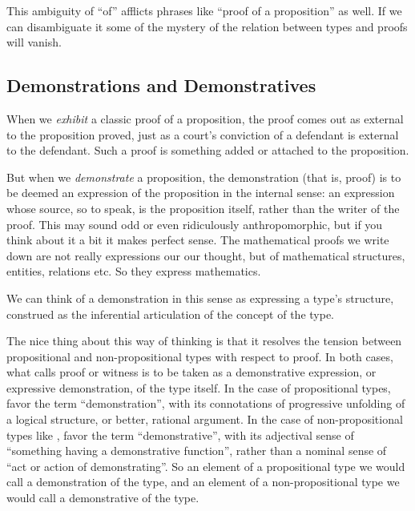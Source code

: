 This ambiguity of ``of'' afflicts phrases like ``proof of a
proposition'' as well.  If we can disambiguate it some of the mystery
of the relation between types and proofs will vanish.

\subsection{Demonstrations and Demonstratives}
\label{subs:}

When we \textit{exhibit} a classic proof of a proposition, the proof
comes out as external to the proposition proved, just as a court's
conviction of a defendant is external to the defendant.  Such a proof
is something added or attached to the proposition.

But when we \textit{demonstrate} a proposition, the demonstration (that is, proof)
is to be deemed an expression of the proposition in the internal
sense: an expression whose source, so to speak, is the proposition
itself, rather than the writer of the proof.  This may sound odd or
even ridiculously anthropomorphic, but if you think about it a bit it
makes perfect sense.  The mathematical proofs we write down are not
really expressions our our thought, but of mathematical structures,
entities, relations etc.  So they express
mathematics.

We can think of a demonstration in this sense as expressing a type's
structure, construed as the inferential articulation of the concept of
the type.

The nice thing about this way of thinking is that it resolves the
tension between propositional and non-propositional types with respect
to proof.  In both cases, what \HoTT{} calls proof or witness is to be
taken as a demonstrative expression, or expressive demonstration, of
the type itself.  In the case of propositional types, favor the term
``demonstration'', with its connotations of progressive unfolding of a
logical structure, or better, rational argument.  In the case of
non-propositional types like \N, favor the term ``demonstrative'',
with its adjectival sense of ``something having a demonstrative
function'', rather than a nominal sense of ``act or action of
demonstrating''.  So an element
of a propositional type we would call a demonstration of the type, and
an element of a non-propositional type we would call a demonstrative
of the type.

